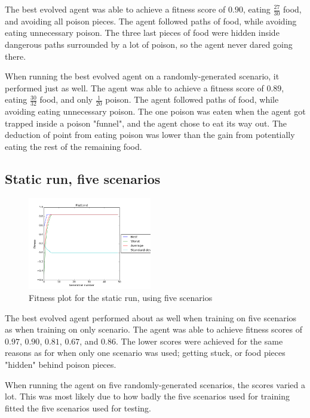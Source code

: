 \documentclass[
]{article}
\begin{document}
The best evolved agent was able to achieve a fitness score of $0.90$, eating $\frac{27}{30}$ food, and avoiding all poison pieces. The agent followed paths of food, while avoiding eating unnecessary poison. The three last pieces of food were hidden inside dangerous paths surrounded by a lot of poison, so the agent never dared going there.

When running the best evolved agent on a randomly-generated scenario, it performed just as well. The agent was able to achieve a fitness score of $0.89$, eating $\frac{30}{32}$ food, and only $\frac{1}{20}$ poison. The agent followed paths of food, while avoiding eating unnecessary poison. The one poison was eaten when the agent got trapped inside a poison "funnel", and the agent chose to eat its way out. The deduction of point from eating poison was lower than the gain from potentially eating the rest of the remaining food.

\subsection{Static run, five scenarios}

\begin{figure}
  \begin{center}
    \includegraphics[width=0.48\textwidth]{static_five_static.png}
  \end{center}
  \caption{Fitness plot for the static run, using five scenarios}
  \label{fig:static_five}
\end{figure}

The best evolved agent performed about as well when training on five scenarios as when training on only scenario. The agent was able to achieve fitness scores of $0.97$, $0.90$, $0.81$, $0.67$, and $0.86$. The lower scores were achieved for the same reasons as for when only one scenario was used; getting stuck, or food pieces "hidden" behind poison pieces.

When running the agent on five randomly-generated scenarios, the scores varied a lot. This was most likely due to how badly the five scenarios used for training fitted the five scenarios used for testing.
\end{document}
